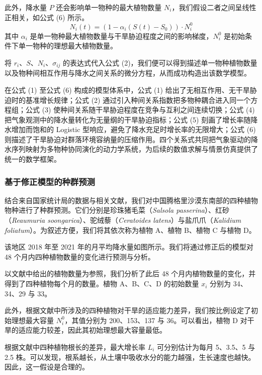 \documentclass[11pt,a4paper]{ctexart}
\begin{document}
此外，降水量 $P$ 还会影响单一物种的最大植物数量 $N_i$，我们假设二者之间呈线性正相关，如公式 (6) 所示。
\begin{equation}
N_i(t)=\left(1-\alpha_i\left(S(t)-S_0\right)\right)\cdot N_i^{0}
\end{equation}
其中 $\alpha_i$ 是单一物种最大植物数量与干旱胁迫程度之间的影响梯度，$N_i^{0}$ 是初始条件下单一物种的理想最大植物数量。

将 $r_i$、$S$、$N_i$、$\sigma_{ij}$ 的表达式代入公式 (2)，我们便可以得到描述单一物种植物数量以及物种间相互作用与降水之间关系的微分方程，从而成功构造出该数学模型。

在公式 (1) 至公式 (6) 构成的模型体系中，公式 (1) 给出了无相互作用、无干旱胁迫时的基准增长规律；公式 (2) 通过引入种间关系指数把多物种耦合进入同一个方程组；公式 (3) 使种间关系随干旱胁迫程度在竞争与互利之间连续切换；公式 (4) 把气象观测中的降水量转化为无量纲的干旱胁迫指标；公式 (5) 刻画了增长率随降水增加而饱和的 Logistic 型响应，避免了降水充足时增长率的无限增大；公式 (6) 则描述了干旱胁迫对群落环境容纳量的压缩作用。四个关系式共同把气象驱动的降水序列映射为多物种协同演化的动力学系统，为后续的数值求解与情景仿真提供了统一的数学框架。

\subsubsection{基于修正模型的种群预测}

结合来自国家统计局的数据与相关文献，我们对中国腾格里沙漠东南部的四种植物物种进行了种群预测。它们分别是珍珠猪毛菜（\textit{Salsola passerina}）、红砂（\textit{Reaumuria soongarica}）、驼绒藜（\textit{Ceratoides latens}）与盐爪爪（\textit{Kalidium foliatum}）。为叙述方便，我们将其依次称为植物 A、植物 B、植物 C 与植物 D。

该地区 2018 年至 2021 年的月平均降水量如图所示。我们将通过修正后的模型对 48 个月内四种植物数量的变化进行预测与分析。

以文献中给出的植物数量为参照，我们分析了此后 48 个月内植物数量的变化，并得到了四种植物每个月的数量。植物 A、B、C、D 的初始数量 $x_i$ 分别为 34、34、29 与 33。

此外，根据文献中所涉及的四种植物对干旱的适应能力差异，我们按比例设定了初始理想最大容量 $N_i^{0}$，其值分别为 200、153、137 与 36。可以看出，植物 D 对干旱的适应能力较差，因此其初始理想最大容量最低。

根据文献中四种植物根长的差异，最大增长率 $L_i$ 可分别估计为每月 5、3.5、5 与 2.5 株。可以发现，根系越长，从土壤中吸收水分的能力越强，生长速度也越快。因此，这一假设是合理的。
\end{document}
